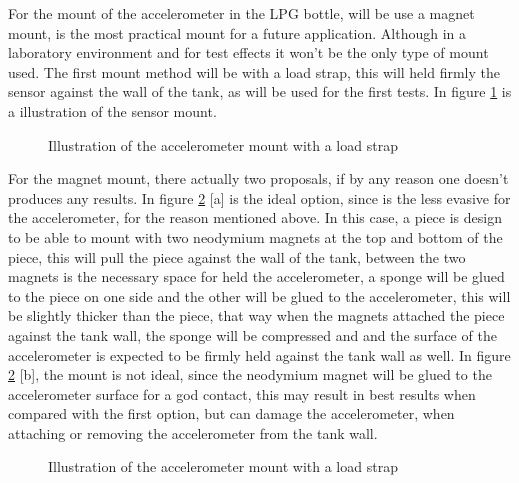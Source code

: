 For the mount of the accelerometer in the LPG bottle, will be use a magnet mount, is the most practical mount for a future application. Although in a laboratory environment and for test effects it won't be the only type of mount used. The first mount method will be with a load strap, this will held firmly the sensor against the wall of the tank, as will be used for the first tests. In figure \ref{fig:mounLoadStrap} is a illustration of the sensor mount.
\begin{figure}[!htb]
    \centering
    \caption{Illustration of the accelerometer mount with a load strap}
    \label{fig:mounLoadStrap}
\end{figure}
For the magnet mount, there actually two proposals, if by any reason one doesn't produces any results. In figure \ref{fig:mounMagnet} [a] is the ideal option, since is the less evasive for the accelerometer, for the reason mentioned above. In this case, a piece is design to be able to mount with two neodymium magnets at the top and bottom of the piece, this will pull the piece against the wall of the tank, between the two magnets is the necessary space for held the accelerometer, a sponge will be glued to the piece on one side and the other will be glued to the accelerometer, this will be slightly thicker than the piece, that way when the magnets attached the piece against the tank wall, the sponge will be compressed and and the surface of the accelerometer is expected to be firmly held against the tank wall as well. In figure \ref{fig:mounMagnet} [b], the mount is not ideal, since the neodymium magnet will be glued to the accelerometer surface for a god contact, this may result in best results when compared with the first option, but can damage the accelerometer, when attaching or removing the accelerometer from the tank wall.
\begin{figure}[!htb]
    \centering
    \caption{Illustration of the accelerometer mount with a load strap}
    \label{fig:mounMagnet}
\end{figure}
%

